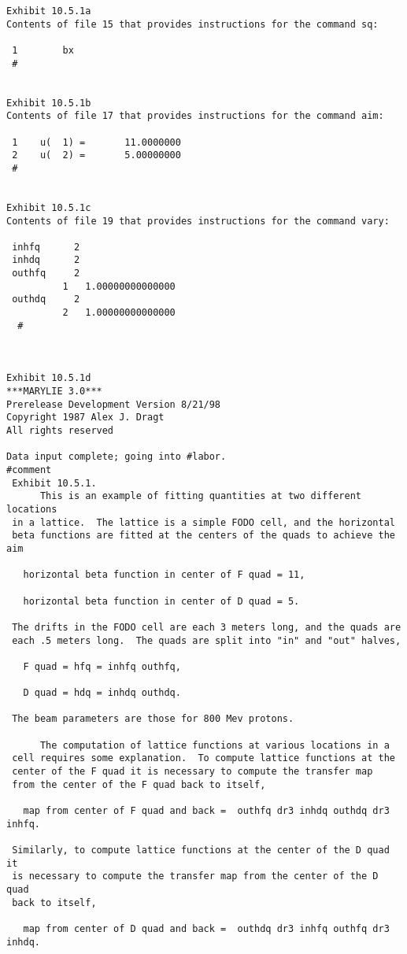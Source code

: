 \begin{footnotesize}
\begin{verbatim}
Exhibit 10.5.1a
Contents of file 15 that provides instructions for the command sq:

 1        bx
 #


Exhibit 10.5.1b
Contents of file 17 that provides instructions for the command aim:

 1    u(  1) =       11.0000000
 2    u(  2) =       5.00000000
 #


Exhibit 10.5.1c
Contents of file 19 that provides instructions for the command vary:

 inhfq      2
 inhdq      2
 outhfq     2
          1   1.00000000000000
 outhdq     2
          2   1.00000000000000
  #



Exhibit 10.5.1d
***MARYLIE 3.0***
Prerelease Development Version 8/21/98
Copyright 1987 Alex J. Dragt
All rights reserved

Data input complete; going into #labor.
#comment
 Exhibit 10.5.1.
      This is an example of fitting quantities at two different locations
 in a lattice.  The lattice is a simple FODO cell, and the horizontal
 beta functions are fitted at the centers of the quads to achieve the aim

   horizontal beta function in center of F quad = 11,

   horizontal beta function in center of D quad = 5.

 The drifts in the FODO cell are each 3 meters long, and the quads are
 each .5 meters long.  The quads are split into "in" and "out" halves,

   F quad = hfq = inhfq outhfq,

   D quad = hdq = inhdq outhdq.

 The beam parameters are those for 800 Mev protons.

      The computation of lattice functions at various locations in a
 cell requires some explanation.  To compute lattice functions at the
 center of the F quad it is necessary to compute the transfer map
 from the center of the F quad back to itself,

   map from center of F quad and back =  outhfq dr3 inhdq outhdq dr3 inhfq.

 Similarly, to compute lattice functions at the center of the D quad it
 is necessary to compute the transfer map from the center of the D quad
 back to itself,

   map from center of D quad and back =  outhdq dr3 inhfq outhfq dr3 inhdq.


\end{verbatim}
\end{footnotesize}
